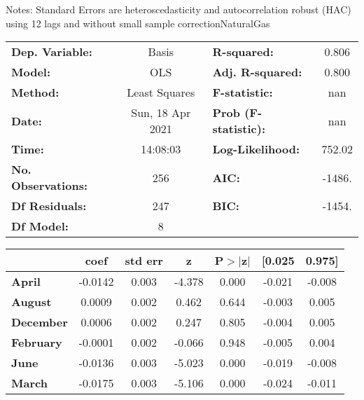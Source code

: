 Notes: \newline
 [1] Standard Errors are heteroscedasticity and autocorrelation robust (HAC) using 12 lags and without small sample correctionNaturalGas\begin{center}
\begin{tabular}{lclc}
\toprule
\textbf{Dep. Variable:}    &      Basis       & \textbf{  R-squared:         } &     0.806   \\
\textbf{Model:}            &       OLS        & \textbf{  Adj. R-squared:    } &     0.800   \\
\textbf{Method:}           &  Least Squares   & \textbf{  F-statistic:       } &       nan   \\
\textbf{Date:}             & Sun, 18 Apr 2021 & \textbf{  Prob (F-statistic):} &      nan    \\
\textbf{Time:}             &     14:08:03     & \textbf{  Log-Likelihood:    } &    752.02   \\
\textbf{No. Observations:} &         256      & \textbf{  AIC:               } &    -1486.   \\
\textbf{Df Residuals:}     &         247      & \textbf{  BIC:               } &    -1454.   \\
\textbf{Df Model:}         &           8      & \textbf{                     } &             \\
\bottomrule
\end{tabular}
\begin{tabular}{lcccccc}
                  & \textbf{coef} & \textbf{std err} & \textbf{z} & \textbf{P$> |$z$|$} & \textbf{[0.025} & \textbf{0.975]}  \\
\midrule
\textbf{April}    &      -0.0142  &        0.003     &    -4.378  &         0.000        &       -0.021    &       -0.008     \\
\textbf{August}   &       0.0009  &        0.002     &     0.462  &         0.644        &       -0.003    &        0.005     \\
\textbf{December} &       0.0006  &        0.002     &     0.247  &         0.805        &       -0.004    &        0.005     \\
\textbf{February} &      -0.0001  &        0.002     &    -0.066  &         0.948        &       -0.005    &        0.004     \\
\textbf{June}     &      -0.0136  &        0.003     &    -5.023  &         0.000        &       -0.019    &       -0.008     \\
\textbf{March}    &      -0.0175  &        0.003     &    -5.106  &         0.000        &       -0.024    &       -0.011     \\

\end{tabular}
\end{center}
